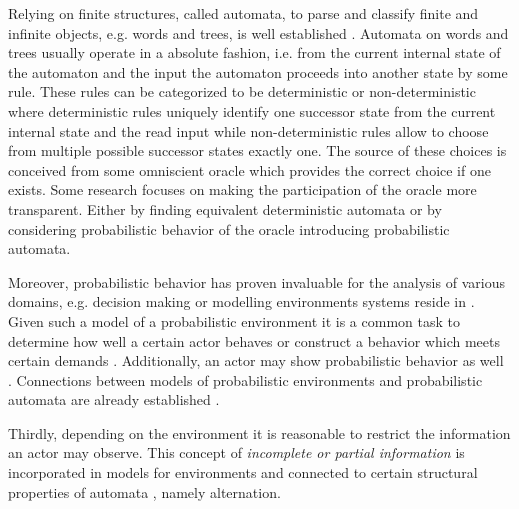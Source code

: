 Relying on finite structures, called automata, to parse and classify finite and
infinite objects, e.g. words and trees, is well established \cite{LangAutoLog,%
AutoInfObj}. Automata on words and trees usually operate in a absolute fashion,
i.e. from the current internal state of the automaton and the input the
automaton proceeds into another state by some rule. These rules can be
categorized to be deterministic or non-deterministic where deterministic rules
uniquely identify one successor state from the current internal state and the
read input while non-deterministic rules allow to choose from multiple possible
successor states exactly one. The source of these choices is conceived from
some omniscient oracle which provides the correct choice if one exists. Some
research focuses on making the participation of the oracle more transparent.
Either by finding equivalent deterministic automata
\cite{NonDetBuechiToDetParity} or by considering probabilistic behavior of the
oracle \cite{RandAutoInfTrees,QualTreeLang,RecOmeLangProbAuto} introducing
probabilistic automata.

Moreover, probabilistic behavior has proven invaluable for the analysis of
various domains, e.g. decision making \cite{ActingOptimallyInPOSD} or modelling
environments systems reside in \cite{PrinciplesOfMC}. Given such a model of a
probabilistic environment it is a common task to determine how well a certain
actor behaves \cite{PrinciplesOfMC} or construct a behavior which meets certain
demands \cite{SynProbEnv,QuanStochParityGames}. Additionally, an actor may show
probabilistic behavior as well \cite{RandomnessForFree}. Connections between
models of probabilistic environments and probabilistic automata are already
established \cite{DecProblemsForProbAuto}.

Thirdly, depending on the environment it is reasonable to restrict the
information an actor may observe. This concept of \emph{incomplete or partial
information} is incorporated in models for environments \cite{QualAnaPOMDP} and
connected to certain structural properties of automata 
\cite{ChurchsProblemRevisited}, namely alternation.

